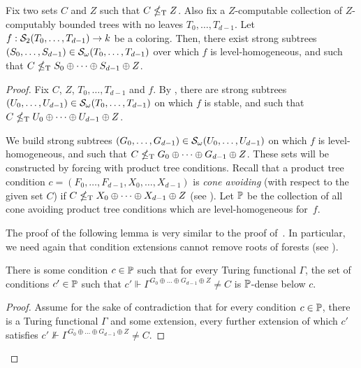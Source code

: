 \begin{theorem}\label{thm:pmtt2-level-homogeneous-strong-cone-avoidance}
Fix two sets $C$ and $Z$ such that $C \nleq_{\text{\upshape T}} Z$.
Also fix a $Z$-computable collection of $Z$-computably bounded trees with no leaves $T_0, \dots,\allowbreak T_{d-1}$.
Let $f: \mathcal{S}_{2}({T_0, \dots, T_{d-1}}) \to k$ be a coloring.
Then, there exist strong
  subtrees $(S_0, \dots, S_{d-1}) \in \mathcal{S}_{\omega}({T_0, \dots, T_{d-1}})$ over which $f$ is level-homogeneous, and such that
  $C \nleq_{\text{\upshape T}} S_0 \oplus \dots \oplus S_{d-1} \oplus Z$.
\end{theorem}

\begin{proof}
Fix $C$, $Z$, $T_0, \dots, T_{d-1}$ and $f$.
By , there are strong subtrees $(U_0, \dots, U_{d-1}) \in \mathcal{S}_{\omega}({T_0, \dots, T_{d-1}})$ on which  $f$ is stable, and such that $C \nleq_{\text{\upshape T}} U_0 \oplus \dots \oplus U_{d-1} \oplus Z$.

We build strong subtrees $(G_0, \dots, G_{d-1}) \in \mathcal{S}_{\omega}({U_0, \dots, U_{d-1}})$  on which $f$ is level-homogeneous, and such that $C \nleq_{\text{\upshape T}} G_0 \oplus \dots \oplus G_{d-1} \oplus Z$. These sets will be constructed by forcing with product tree conditions. Recall that a product tree condition $c = (F_0, \dots, F_{d-1}, X_0, \dots, X_{d-1})$ is \emph{cone avoiding} (with respect to the given set $C$) if $C \nleq_{\text{\upshape T}} X_0 \oplus \dots \oplus X_{d-1} \oplus Z$ (see ).
Let $\mathbb{P}$ be the collection of all cone avoiding product tree conditions which are level-homogeneous for~$f$.

The proof of the following lemma is very similar to {the proof of}~. In particular, we need again that condition extensions cannot remove roots of forests (see ).

\begin{lemma}\label{lem:pmtt2-level-homogeneous-density-below-a-cone}
There is some condition $c \in \mathbb{P}$
such that for every Turing functional $\Gamma$, the set of conditions $c' \in \mathbb{P}$
such that $c' \Vdash \Gamma^{G_0 \oplus \dots \oplus G_{d-1} \oplus Z} \neq C$
is $\mathbb{P}$-dense below $c$.
\end{lemma}
\begin{proof}
Assume for the sake of contradiction that for every condition $c \in \mathbb{P}$,
there is a Turing functional $\Gamma$ and some extension, every further extension of which $c'$ satisfies $c' \not\Vdash \Gamma^{G_0 \oplus \dots \oplus G_{d-1} \oplus Z} \neq C$.


\end{proof}
\end{proof}
